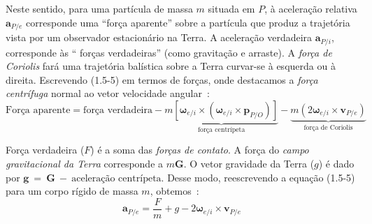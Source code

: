 Neste sentido, para uma partícula de massa \(m\) situada em \(P\), à aceleração relativa \(\mathbf{a}_{P/e}\) corresponde uma ``força aparente'' sobre a partícula que produz a trajetória vista por um observador estacionário na Terra. A aceleração verdadeira \(\mathbf{a}_{P/i}\), corresponde às `` forças verdadeiras'' (como gravitação e arraste). A \textit{força de Coriolis}\footnotemark{} fará uma trajetória balística sobre a Terra curvar-se à esquerda ou à direita. Escrevendo (1.5-5) em termos de forças, onde destacamos a \textit{força centrífuga} normal ao vetor velocidade angular~\cite{Stevens2016}:
\begin{equation*}
    \text{Força aparente} = \text{força verdadeira} - \underbrace{m \left[{\mathbf{\omega}_{e/i}}\!\times\!\left({\mathbf{\omega}_{e/i}}\!\times\!{\mathbf{p}_{P/O}}\right)\right]}_{\text{força centrípeta}} - \underbrace{m \left( 2{\mathbf{\omega}_{e/i}}\!\times\!{\mathbf{v}_{P/e}}\right)}_{\text{força de Coriolis}}
\end{equation*}

Força verdadeira (\(F\)) é a soma das \textit{forças de contato}. A força do  \textit{campo gravitacional da Terra} corresponde a \(m\mathbf{G}\). O vetor gravidade da Terra (\(g\)) é dado por {\(\mathbf{g}~=~\mathbf{G}~-~\text{aceleração centrípeta}\)}. Desse modo, reescrevendo a equação (1.5-5) para um corpo rígido de massa \(m\), obtemos~\cite{Stevens2016}:
\begin{equation*} \tag{1.5-6}
    \mathbf{a}_{P/e} = \frac{F}{m} + g - {2 \mathbf{\omega}_{e/i}}\!\times\!{\mathbf{v}_{P/e}}
\end{equation*}

